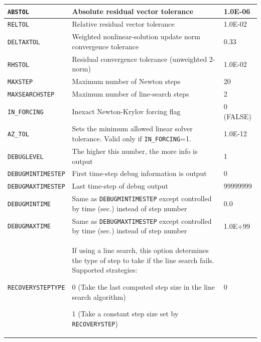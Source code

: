 \begin{longtable}[htbp]{|>{\setlength{\hsize}{.9\hsize}}Y|
>{\setlength{\hsize}{1.2\hsize}}Y|
>{\setlength{\hsize}{.9\hsize}}Y|}
\texttt{ABSTOL} & Absolute residual vector tolerance &
1.0E-06 \\ \hline

\texttt{RELTOL} & Relative residual vector tolerance &
1.0E-02 \\ \hline

\texttt{DELTAXTOL} & Weighted nonlinear-solution update norm convergence
tolerance & 0.33 \\ \hline

\texttt{RHSTOL} & Residual convergence tolerance (unweighted 2-norm) &
1.0E-02 \\ \hline

\texttt{MAXSTEP} & Maximum number of Newton steps & 20
\\ \hline

\texttt{MAXSEARCHSTEP} & Maximum number of line-search steps & 2 \\ \hline

\texttt{IN\_FORCING} & Inexact Newton-Krylov forcing flag & 0 (FALSE) \\ \hline

\texttt{AZ\_TOL} &  Sets the minimum allowed linear solver tolerance. Valid only if \texttt{IN\_FORCING}=1.  & 1.0E-12 \\ \hline

\texttt{DEBUGLEVEL} & The higher this number, the more info is output & 1
\\ \hline

\texttt{DEBUGMINTIMESTEP} & First time-step debug information is output & 0
\\ \hline

\texttt{DEBUGMAXTIMESTEP} & Last time-step of debug output & 99999999 \\
\hline

\texttt{DEBUGMINTIME} & Same as \texttt{DEBUGMINTIMESTEP} except controlled by
time (sec.) instead of step number & 0.0 \\ \hline

\texttt{DEBUGMAXTIME} & Same as \texttt{DEBUGMAXTIMESTEP} except controlled by
time (sec.) instead of step number & 1.0E+99 \\ \hline

\texttt{RECOVERYSTEPTYPE} &  If using a line search, this option determines the type of step to take if the line search fails. Supported strategies:
\begin{XyceItemize}
\item 0 (Take the last computed step size in the line search algorithm)
\item 1 (Take a constant step size set by \texttt{RECOVERYSTEP})
\end{XyceItemize} & 0 \\ \hline


\end{longtable}
